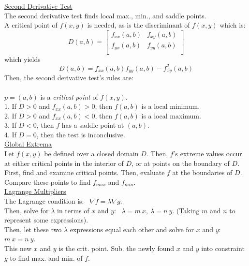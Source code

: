 \documentclass[10pt]{article}
\begin{document}
\underline{Second Derivative Test}\\
The second derivative test finds local max., min., and saddle points.\\
A critical point of $f(x,y)$ is needed, as is the discriminant of $f(x,y)$ which is:
$$
D(a,b) = \begin{bmatrix}
 f_{xx}(a,b) & f_{xy}(a,b)\\
  f_{yx}(a,b) & f_{yy}(a,b)\\
\end{bmatrix}
$$
which yields
$$
D(a,b) = f_{xx}(a,b) f_{yy}(a,b) - f_{xy}^2(a,b)
$$
Then, the second derivative test's rules are:\\\\
 $p = (a,b)$ is a \emph{critical point} of $f(x,y)$.\\
1. If $D > 0$ and $f_{xx}(a,b) > 0$, then $f(a,b)$ is a local minimum.\\
2. If $D > 0$ and $f_{xx}(a,b) < 0$, then $f(a,b)$ is a local maximum.\\
3. If $D < 0$, then $f$ has a saddle point at $(a,b)$.\\
4. If $D = 0$, then the test is inconclusive.\\

\underline{Global Extrema}\\
Let $f(x,y)$ be defined over a closed domain $D$. Then, $f$'s extreme values occur at either critical points in the interior of $D$, or at points on the boundary of $D$.\\
First, find and examine critical points. Then, evaluate $f$ at the boundaries of $D$. Compare these points to find $f_{max}$ and $f_{min}$.\\

\underline{Lagrange Multipliers}\\
The Lagrange condition is: \ $\nabla f = \lambda \nabla g$.\\
Then, solve for $\lambda$ in terms of $x$ and $y$: \ $\lambda = m \ x, \ \lambda = n \ y$.
(Taking $m$ and $n$ to represent some expressions).\\
Then, let these two $\lambda$ expressions equal each other and solve for $x$ and $y$: \ $m \ x = n \ y$.\\
This new $x$ and $y$ is the crit. point. Sub. the newly found $x$ and $y$ into constraint $g$ to find max. and min. of $f$.\\
\end{document}
